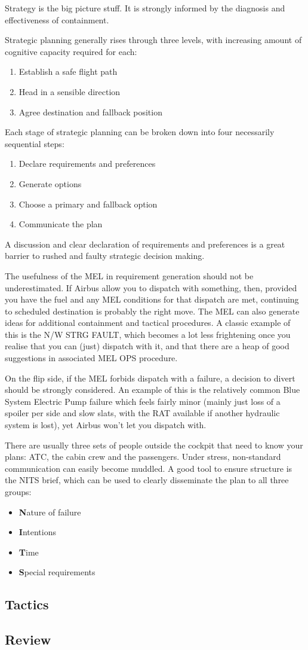 \documentclass[a5paper,11pt,titlepage]{article} \usepackage[utf8]{inputenc}
\begin{document}
Strategy is the big picture stuff. It is strongly informed by the
diagnosis and effectiveness of containment.

Strategic planning generally rises through three levels, with increasing
amount of cognitive capacity required for each:

\begin{enumerate}
\item Establish a safe flight path
\item Head in a sensible direction
\item Agree destination and fallback position
\end{enumerate}

Each stage of strategic planning can be broken down into four
necessarily sequential steps:

\begin{enumerate}
\item Declare requirements and preferences
\item Generate options
\item Choose a primary and fallback option
\item Communicate the plan
\end{enumerate}

A discussion and clear declaration of requirements and preferences is a
great barrier to rushed and faulty strategic decision making.

The usefulness of the MEL in requirement generation should not be
underestimated. If Airbus allow you to dispatch with something, then,
provided you have the fuel and any MEL conditions for that dispatch are
met, continuing to scheduled destination is probably the right move. The
MEL can also generate ideas for additional containment and tactical
procedures. A classic example of this is the N/W STRG FAULT, which
becomes a lot less frightening once you realise that you can (just)
dispatch with it, and that there are a heap of good suggestions in
associated MEL OPS procedure.

On the flip side, if the MEL forbids dispatch with a failure, a decision
to divert should be strongly considered. An example of this is the
relatively common Blue System Electric Pump failure which feels fairly
minor (mainly just loss of a spoiler per side and slow slats, with the
RAT available if another hydraulic system is lost), yet Airbus won't
let you dispatch with.

There are usually three sets of people outside the cockpit that need to
know your plans: ATC, the cabin crew and the passengers. Under stress,
non-standard communication can easily become muddled. A good tool to
ensure structure is the NITS brief, which can be used to clearly
disseminate the plan to all three groups:

\begin{itemize}
\item \textbf{N}ature of failure
\item \textbf{I}ntentions
\item \textbf{T}ime
\item \textbf{S}pecial requirements
\end{itemize}

\subsection{Tactics}
\subsection{Review}
\end{document}
